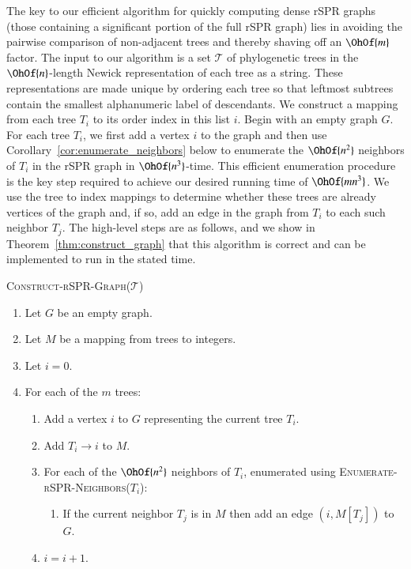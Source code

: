 \documentclass[]{elsarticle}
\begin{document}
The key to our efficient algorithm for quickly computing dense rSPR graphs (those containing a significant portion of the full rSPR graph) lies in avoiding the pairwise comparison of non-adjacent trees and thereby shaving off an $\OhOf{m}$ factor.
The input to our algorithm is a set $\mathcal{T}$ of phylogenetic trees in the $\OhOf{n}$-length Newick \citep{wiki:newick} representation of each tree as a string.
These representations are made unique by ordering each tree so that leftmost subtrees contain the smallest alphanumeric label of descendants.
We construct a mapping from each tree $T_i$ to its order index in this list $i$.
Begin with an empty graph $G$.
For each tree $T_i$, we first add a vertex $i$ to the graph and then use Corollary~\ref{cor:enumerate_neighbors} below to enumerate the $\OhOf{n^2}$ neighbors of $T_i$ in the rSPR graph in $\OhOf{n^3}$-time.
This efficient enumeration procedure is the key step required to achieve our desired running time of $\OhOf{mn^3}$.
We use the tree to index mappings to determine whether these trees are already vertices of the graph and, if so, add an edge in the graph from $T_i$ to each such neighbor $T_j$.
The high-level steps are as follows, and we show in Theorem~\ref{thm:construct_graph} that this algorithm is correct and can be implemented to run in the stated time.

\vspace{1em}
\textsc{Construct-rSPR-Graph($\mathcal{T}$)}
\begin{enumerate}[label={\arabic*}.]
	\item Let $G$ be an empty graph.
	\item Let $M$ be a mapping from trees to integers.
	\item Let $i = 0$.
	\item For each of the $m$ trees: \vspace{-0.2em}
		\begin{enumerate}
			\item Add a vertex $i$ to $G$ representing the current tree $T_i$.
			\item Add $T_i \rightarrow i$ to $M$.
			\item For each of the $\OhOf{n^2}$ neighbors of $T_i$, enumerated using \textsc{Enumerate-rSPR-Neighbors($T_i$)}:
				\begin{enumerate}
					\item If the current neighbor $T_j$ is in $M$ then add an edge $(i,M[T_j])$ to $G$.
				\end{enumerate}
		\item $i = i + 1$.
		\end{enumerate}
\end{enumerate}
\end{document}
